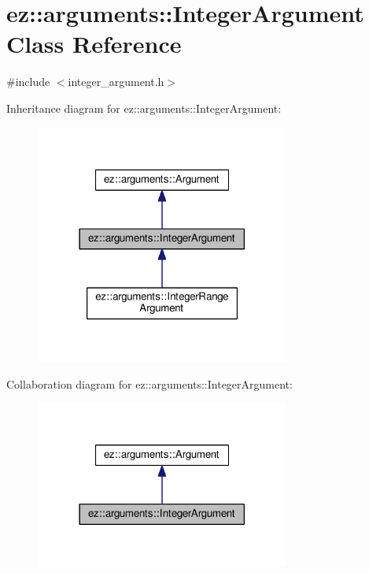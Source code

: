 \hypertarget{classez_1_1arguments_1_1IntegerArgument}{}\section{ez\+:\+:arguments\+:\+:Integer\+Argument Class Reference}
\label{classez_1_1arguments_1_1IntegerArgument}


{\ttfamily \#include $<$integer\+\_\+argument.\+h$>$}



Inheritance diagram for ez\+:\+:arguments\+:\+:Integer\+Argument\+:
\nopagebreak
\begin{figure}[H]
\begin{center}
\leavevmode
\includegraphics[width=237pt]{classez_1_1arguments_1_1IntegerArgument__inherit__graph}
\end{center}
\end{figure}


Collaboration diagram for ez\+:\+:arguments\+:\+:Integer\+Argument\+:
\nopagebreak
\begin{figure}[H]
\begin{center}
\leavevmode
\includegraphics[width=237pt]{classez_1_1arguments_1_1IntegerArgument__coll__graph}
\end{center}
\end{figure}
